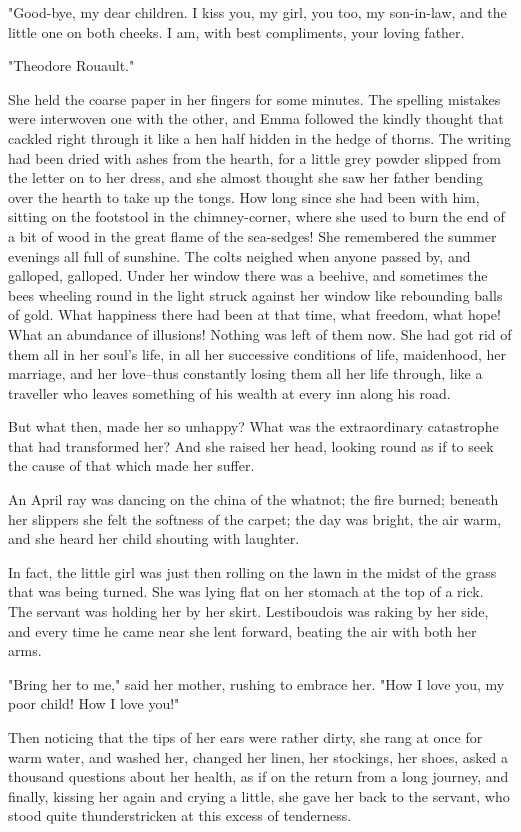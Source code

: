 \documentclass{tufte-book}
\begin{document}
"Good-bye, my dear children. I kiss you, my girl, you too, my
son-in-law, and the little one on both cheeks. I am, with best
compliments, your loving father.

"Theodore Rouault."

She held the coarse paper in her fingers for some minutes. The spelling
mistakes were interwoven one with the other, and Emma followed the
kindly thought that cackled right through it like a hen half hidden
in the hedge of thorns. The writing had been dried with ashes from
the hearth, for a little grey powder slipped from the letter on to her
dress, and she almost thought she saw her father bending over the hearth
to take up the tongs. How long since she had been with him, sitting on
the footstool in the chimney-corner, where she used to burn the end of
a bit of wood in the great flame of the sea-sedges! She remembered the
summer evenings all full of sunshine. The colts neighed when anyone
passed by, and galloped, galloped. Under her window there was a beehive,
and sometimes the bees wheeling round in the light struck against her
window like rebounding balls of gold. What happiness there had been
at that time, what freedom, what hope! What an abundance of illusions!
Nothing was left of them now. She had got rid of them all in her soul's
life, in all her successive conditions of life, maidenhood, her marriage,
and her love--thus constantly losing them all her life through, like
a traveller who leaves something of his wealth at every inn along his
road.

But what then, made her so unhappy? What was the extraordinary
catastrophe that had transformed her? And she raised her head, looking
round as if to seek the cause of that which made her suffer.

An April ray was dancing on the china of the whatnot; the fire burned;
beneath her slippers she felt the softness of the carpet; the day was
bright, the air warm, and she heard her child shouting with laughter.

In fact, the little girl was just then rolling on the lawn in the midst
of the grass that was being turned. She was lying flat on her stomach
at the top of a rick. The servant was holding her by her skirt.
Lestiboudois was raking by her side, and every time he came near she
lent forward, beating the air with both her arms.

"Bring her to me," said her mother, rushing to embrace her. "How I love
you, my poor child! How I love you!"

Then noticing that the tips of her ears were rather dirty, she rang at
once for warm water, and washed her, changed her linen, her stockings,
her shoes, asked a thousand questions about her health, as if on the
return from a long journey, and finally, kissing her again and crying
a little, she gave her back to the servant, who stood quite
thunderstricken at this excess of tenderness.
\end{document}
